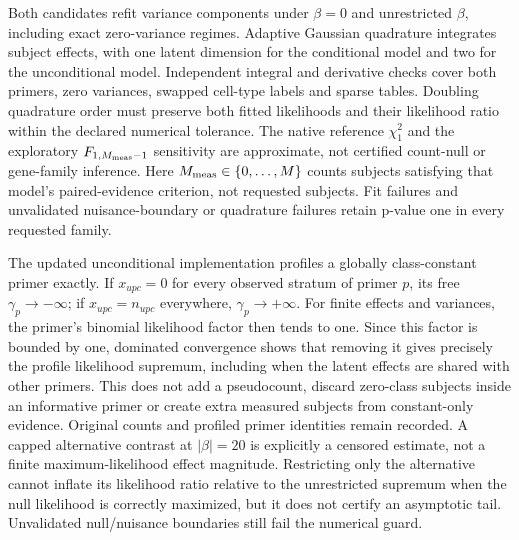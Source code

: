 \documentclass[11pt]{article}
\begin{document}
Both candidates refit variance components under \(\beta=0\) and unrestricted \(\beta\), including exact zero-variance regimes. Adaptive Gaussian quadrature integrates subject effects, with one latent dimension for the conditional model and two for the unconditional model. Independent integral and derivative checks cover both primers, zero variances, swapped cell-type labels and sparse tables. Doubling quadrature order must preserve both fitted likelihoods and their likelihood ratio within the declared numerical tolerance. The native reference \(\chi_1^2\) and the exploratory \(F_{1,M_{\rm meas}-1}\) sensitivity are approximate, not certified count-null or gene-family inference. Here \(M_{\rm meas}\in\{0,\ldots,M\}\) counts subjects satisfying that model's paired-evidence criterion, not requested subjects. Fit failures and unvalidated nuisance-boundary or quadrature failures retain p-value one in every requested family.

The updated unconditional implementation profiles a globally class-constant primer exactly. If \(x_{upc}=0\) for every observed stratum of primer \(p\), its free \(\gamma_p\to-\infty\); if \(x_{upc}=n_{upc}\) everywhere, \(\gamma_p\to+\infty\). For finite effects and variances, the primer's binomial likelihood factor then tends to one. Since this factor is bounded by one, dominated convergence shows that removing it gives precisely the profile likelihood supremum, including when the latent effects are shared with other primers. This does not add a pseudocount, discard zero-class subjects inside an informative primer or create extra measured subjects from constant-only evidence. Original counts and profiled primer identities remain recorded. A capped alternative contrast at \(\lvert\beta\rvert=20\) is explicitly a censored estimate, not a finite maximum-likelihood effect magnitude. Restricting only the alternative cannot inflate its likelihood ratio relative to the unrestricted supremum when the null likelihood is correctly maximized, but it does not certify an asymptotic tail. Unvalidated null/nuisance boundaries still fail the numerical guard.
\end{document}
